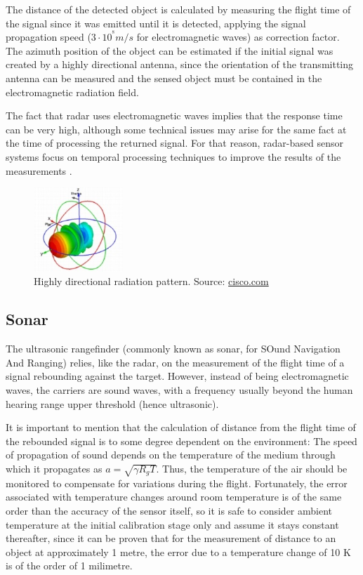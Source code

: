 The distance of the detected object is calculated by measuring the flight time of the signal since it was emitted until it is detected, applying the signal propagation speed ($3 \cdot 10^{^8} m/s$ for electromagnetic waves) as correction factor.
The azimuth position of the object can be estimated if the initial signal was created by a highly directional antenna, since the orientation of the transmitting antenna can be measured and the sensed object must be contained in the electromagnetic radiation field.

The fact that radar uses electromagnetic waves implies that the response time can be very high, although some technical issues may arise for the same fact at the time of processing the returned signal.
For that reason, radar-based sensor systems focus on temporal processing techniques to improve the results of the measurements \cite{krolik2005}.

\begin{figure}[htbp]
	\centering
	\includegraphics[width=0.3\textwidth]{./figures/antennaPattern.jpg}
	\caption{Highly directional radiation pattern. {\footnotesize Source: \url{cisco.com}}}
	\label{fig:antenna}
\end{figure}

\subsection{Sonar}

The ultrasonic rangefinder (commonly known as sonar, for SOund Navigation And Ranging) relies, like the radar, on the measurement of the flight time of a signal rebounding against the target.
However, instead of being electromagnetic waves, the carriers are sound waves, with a frequency usually beyond the human hearing range upper threshold (hence ultrasonic).

It is important to mention that the calculation of distance from the flight time of the rebounded signal is to some degree dependent on the environment:
The speed of propagation of sound depends on the temperature of the medium through which it propagates as $a=\sqrt{\gamma R_g T}$.
Thus, the temperature of the air should be monitored to compensate for variations during the flight.
Fortunately, the error associated with temperature changes around room temperature is of the same order than the accuracy of the sensor itself, so it is safe to consider ambient temperature at the initial calibration stage only and assume it stays constant thereafter, since it can be proven that for the measurement of distance to an object at approximately 1 metre, the error due to a temperature change of 10 K is of the order of 1 milimetre.

